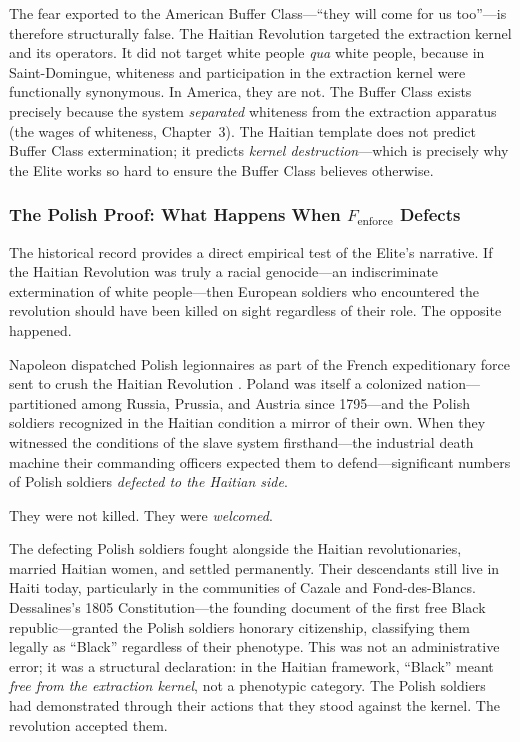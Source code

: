 \documentclass[12pt,openany]{book}
\begin{document}
The fear exported to the American Buffer Class---``they will come for us too''---is therefore structurally false. The Haitian Revolution targeted the extraction kernel and its operators. It did not target white people \textit{qua} white people, because in Saint-Domingue, whiteness and participation in the extraction kernel were functionally synonymous. In America, they are not. The Buffer Class exists precisely because the system \textit{separated} whiteness from the extraction apparatus (the wages of whiteness, Chapter~3). The Haitian template does not predict Buffer Class extermination; it predicts \textit{kernel destruction}---which is precisely why the Elite works so hard to ensure the Buffer Class believes otherwise.

\subsubsection*{The Polish Proof: What Happens When \texorpdfstring{$F_{\text{enforce}}$}{F\_enforce} Defects}

The historical record provides a direct empirical test of the Elite's narrative. If the Haitian Revolution was truly a racial genocide---an indiscriminate extermination of white people---then European soldiers who encountered the revolution should have been killed on sight regardless of their role. The opposite happened.

Napoleon dispatched Polish legionnaires as part of the French expeditionary force sent to crush the Haitian Revolution \cite{pachonski}. Poland was itself a colonized nation---partitioned among Russia, Prussia, and Austria since 1795---and the Polish soldiers recognized in the Haitian condition a mirror of their own. When they witnessed the conditions of the slave system firsthand---the industrial death machine their commanding officers expected them to defend---significant numbers of Polish soldiers \textit{defected to the Haitian side}.

They were not killed. They were \textit{welcomed}.

The defecting Polish soldiers fought alongside the Haitian revolutionaries, married Haitian women, and settled permanently. Their descendants still live in Haiti today, particularly in the communities of Cazale and Fond-des-Blancs. Dessalines's 1805 Constitution---the founding document of the first free Black republic---granted the Polish soldiers honorary citizenship, classifying them legally as ``Black'' regardless of their phenotype. This was not an administrative error; it was a structural declaration: in the Haitian framework, ``Black'' meant \textit{free from the extraction kernel}, not a phenotypic category. The Polish soldiers had demonstrated through their actions that they stood against the kernel. The revolution accepted them.
\end{document}
